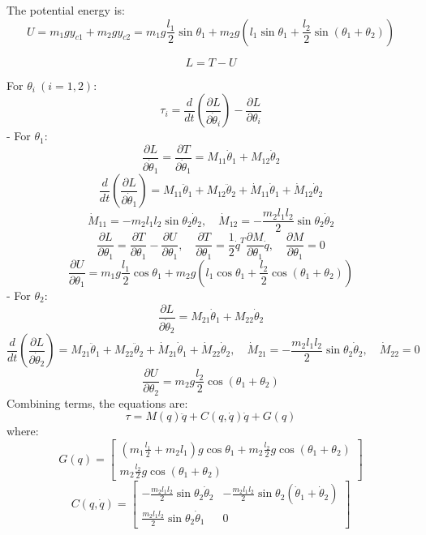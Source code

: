 \documentclass[12pt,a4paper]{article}
\begin{document}
The potential energy is:
\[
U = m_1 g y_{c1} + m_2 g y_{c2} = m_1 g \frac{l_1}{2} \sin \theta_1 + m_2 g \left( l_1 \sin \theta_1 + \frac{l_2}{2} \sin (\theta_1 + \theta_2) \right)
\]

\[
L = T - U
\]

For \( \theta_i \ (i=1,2) \):
\[
\tau_i = \frac{d}{dt} \left( \frac{\partial L}{\partial \dot{\theta}_i} \right) - \frac{\partial L}{\partial \theta_i}
\]
- For \( \theta_1 \):
\[
\frac{\partial L}{\partial \dot{\theta}_1} = \frac{\partial T}{\partial \dot{\theta}_1} = M_{11} \dot{\theta}_1 + M_{12} \dot{\theta}_2
\]
\[
\frac{d}{dt} \left( \frac{\partial L}{\partial \dot{\theta}_1} \right) = M_{11} \ddot{\theta}_1 + M_{12} \ddot{\theta}_2 + \dot{M}_{11} \dot{\theta}_1 + \dot{M}_{12} \dot{\theta}_2
\]
\[
\dot{M}_{11} = -m_2 l_1 l_2 \sin \theta_2 \dot{\theta}_2, \quad \dot{M}_{12} = -\frac{m_2 l_1 l_2}{2} \sin \theta_2 \dot{\theta}_2
\]
\[
\frac{\partial L}{\partial \theta_1} = \frac{\partial T}{\partial \theta_1} - \frac{\partial U}{\partial \theta_1}, \quad \frac{\partial T}{\partial \theta_1} = \frac{1}{2} \dot{q}^T \frac{\partial M}{\partial \theta_1} \dot{q}, \quad \frac{\partial M}{\partial \theta_1} = 0
\]
\[
\frac{\partial U}{\partial \theta_1} = m_1 g \frac{l_1}{2} \cos \theta_1 + m_2 g \left( l_1 \cos \theta_1 + \frac{l_2}{2} \cos (\theta_1 + \theta_2) \right)
\]
- For \( \theta_2 \):
\[
\frac{\partial L}{\partial \dot{\theta}_2} = M_{21} \dot{\theta}_1 + M_{22} \dot{\theta}_2
\]
\[
\frac{d}{dt} \left( \frac{\partial L}{\partial \dot{\theta}_2} \right) = M_{21} \ddot{\theta}_1 + M_{22} \ddot{\theta}_2 + \dot{M}_{21} \dot{\theta}_1 + \dot{M}_{22} \dot{\theta}_2, \quad \dot{M}_{21} = -\frac{m_2 l_1 l_2}{2} \sin \theta_2 \dot{\theta}_2, \quad \dot{M}_{22} = 0
\]
\[
\frac{\partial U}{\partial \theta_2} = m_2 g \frac{l_2}{2} \cos (\theta_1 + \theta_2)
\]
Combining terms, the equations are:
\[
\tau = M(q) \ddot{q} + C(q, \dot{q}) \dot{q} + G(q)
\]
where:
\[
G(q) = \begin{bmatrix}
\left( m_1 \frac{l_1}{2} + m_2 l_1 \right) g \cos \theta_1 + m_2 \frac{l_2}{2} g \cos (\theta_1 + \theta_2) \\
m_2 \frac{l_2}{2} g \cos (\theta_1 + \theta_2)
\end{bmatrix}
\]
\[
C(q, \dot{q}) = \begin{bmatrix}
-\frac{m_2 l_1 l_2}{2} \sin \theta_2 \dot{\theta}_2 & -\frac{m_2 l_1 l_2}{2} \sin \theta_2 (\dot{\theta}_1 + \dot{\theta}_2) \\
\frac{m_2 l_1 l_2}{2} \sin \theta_2 \dot{\theta}_1 & 0
\end{bmatrix}
\]
\end{document}
